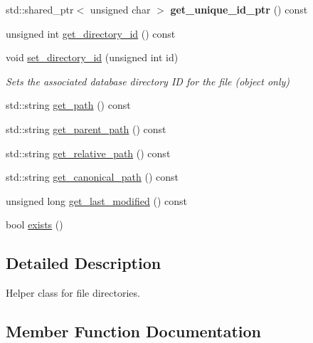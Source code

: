 \begin{DoxyCompactItemize}
\item 
\mbox{\label{class_vessel_1_1_file_1_1_backup_directory_ac3b65d2ac48d6ca45a0ae3be43e22096}} 
std\+::shared\+\_\+ptr$<$ unsigned char $>$ {\bfseries get\+\_\+unique\+\_\+id\+\_\+ptr} () const
\item 
unsigned int \hyperlink{class_vessel_1_1_file_1_1_backup_directory_a0fa5c915847b2ecef1929011fe9a91b0}{get\+\_\+directory\+\_\+id} () const
\item 
\mbox{\label{class_vessel_1_1_file_1_1_backup_directory_a28481148c7d7311084c6cc838981e379}} 
void \hyperlink{class_vessel_1_1_file_1_1_backup_directory_a28481148c7d7311084c6cc838981e379}{set\+\_\+directory\+\_\+id} (unsigned int id)
\begin{DoxyCompactList}\small\item\em Sets the associated database directory ID for the file (object only) \end{DoxyCompactList}\item 
std\+::string \hyperlink{class_vessel_1_1_file_1_1_backup_directory_a47ff6b7be593c424b5e2f68a5abb3987}{get\+\_\+path} () const
\item 
std\+::string \hyperlink{class_vessel_1_1_file_1_1_backup_directory_aeb7e8ef5e3860f27c3af785eeacaf747}{get\+\_\+parent\+\_\+path} () const
\item 
std\+::string \hyperlink{class_vessel_1_1_file_1_1_backup_directory_a5c16b60753eeefbf7426fb08c99a73bd}{get\+\_\+relative\+\_\+path} () const
\item 
std\+::string \hyperlink{class_vessel_1_1_file_1_1_backup_directory_aed6edcfe0cc919b123062c010f41f409}{get\+\_\+canonical\+\_\+path} () const
\item 
unsigned long \hyperlink{class_vessel_1_1_file_1_1_backup_directory_a50a44bfa0922120735f67a9c42a1f08b}{get\+\_\+last\+\_\+modified} () const
\item 
bool \hyperlink{class_vessel_1_1_file_1_1_backup_directory_a6c078cda9a606d2bce8c874d664f9127}{exists} ()
\end{DoxyCompactItemize}


\subsection{Detailed Description}
Helper class for file directories. 

\subsection{Member Function Documentation}
\mbox{\label{class_vessel_1_1_file_1_1_backup_directory_a6c078cda9a606d2bce8c874d664f9127}} 
